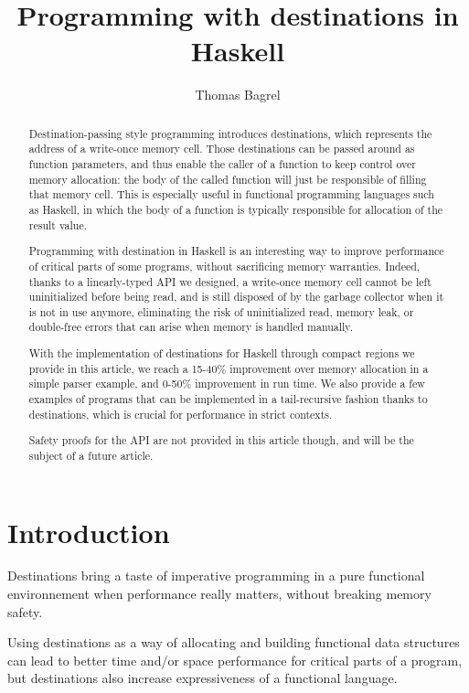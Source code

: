 \documentclass[english]{jflart}
\title{Programming with destinations in Haskell}
\author[1]{Thomas Bagrel}
\affil[1]{INRIA/LORIA, Vand\oe{}uvre-lès-Nancy, 54500, France}
\affil[2]{TWEAG, Paris, 75012, France}
\begin{document}
\maketitle

\begin{abstract}
Destination-passing style programming introduces destinations, which represents the address of a write-once memory cell. Those destinations can be passed around as function parameters, and thus enable the caller of a function to keep control over memory allocation: the body of the called function will just be responsible of filling that memory cell. This is especially useful in functional programming languages such as Haskell, in which the body of a function is typically responsible for allocation of the result value.

Programming with destination in Haskell is an interesting way to improve performance of critical parts of some programs, without sacrificing memory warranties. Indeed, thanks to a linearly-typed API we designed, a write-once memory cell cannot be left uninitialized before being read, and is still disposed of by the garbage collector when it is not in use anymore, eliminating the risk of uninitialized read, memory leak, or double-free errors that can arise when memory is handled manually.

With the implementation of destinations for Haskell through compact regions we provide in this article, we reach a 15-40\% improvement over memory allocation in a simple parser example, and 0-50\% improvement in run time. We also provide a few examples of programs that can be implemented in a tail-recursive fashion thanks to destinations, which is crucial for performance in strict contexts.

Safety proofs for the API are not provided in this article though, and will be the subject of a future article.
\end{abstract}

\tableofcontents{}

\section{Introduction}

Destinations bring a taste of imperative programming in a pure functional environnement when performance really matters, without breaking memory safety.

Using destinations as a way of allocating and building functional data structures can lead to better time and/or space performance for critical parts of a program, but destinations also increase expressiveness of a functional language.
\end{document}
